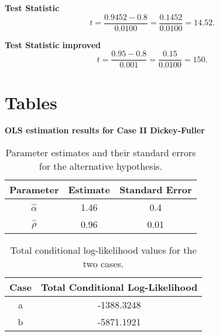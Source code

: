 \documentclass[12pt]{article}
\begin{document}
\textbf{Test Statistic}
\begin{equation}
t = \frac{0.9452 - 0.8}{0.0100} = \frac{0.1452}{0.0100} = 14.52.
    \label{eq:tstatmlone}
\end{equation}

\textbf{Test Statistic improved}
\begin{equation}
t = \frac{0.95 - 0.8}{0.001} = \frac{0.15}{0.0100} = 150.
    \label{eq:tstatmltwo}
\end{equation}


\newpage
\section{Tables}
\textbf{OLS estimation results for Case II Dickey-Fuller}
\begin{table}[h!]
\centering
\begin{tabular}{|c|c|c|}
\hline
\textbf{Parameter} & \textbf{Estimate} & \textbf{Standard Error} \\ \hline
$\hat{\alpha}$     & 1.46              & 0.4                     \\ \hline
$\hat{\rho}$       & 0.96              & 0.01                    \\ \hline
\end{tabular}
\caption{Parameter estimates and their standard errors for the alternative hypothesis.}
\label{tab:parameter_estimates}
\end{table}

\begin{table}[h!]
\centering
\begin{tabular}{|c|c|}
\hline
\textbf{Case} & \textbf{Total Conditional Log-Likelihood} \\ \hline
a             & -1388.3248                                \\ \hline
b             & -5871.1921                                \\ \hline
\end{tabular}
\caption{Total conditional log-likelihood values for the two cases.}
\label{tab:log_likelihood_results}
\end{table}
\end{document}
